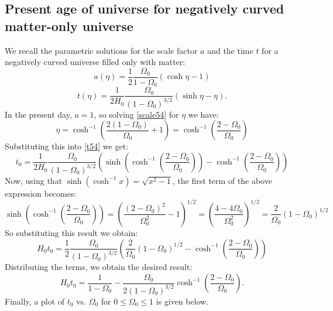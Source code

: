 \subsection{Present age of universe for negatively curved matter-only universe}
We recall the parametric solutions for the scale factor $a$ and the time $t$ for a negatively curved universe filled only with matter:
\begin{equation}\label{scale54}
    a(\eta) = \frac{1}{2}\frac{\Omega_0}{1 - \Omega_0}(\cosh\eta - 1)
\end{equation}
\begin{equation}\label{t54}
    t(\eta) = \frac{1}{2H_0}\frac{\Omega_0}{(1 - \Omega_0)^{3/2}}(\sinh\eta - \eta).
\end{equation}
In the present day, $a = 1$, so solving \eqref{scale54} for $\eta$ we have:
\begin{equation}
    \eta = \cosh^{-1}\left(\frac{2(1 - \Omega_0)}{\Omega_0} + 1\right) = \cosh^{-1}\left(\frac{2 - \Omega_0}{\Omega_0}\right)
\end{equation}
Substituting this into \eqref{t54} we get:
\begin{equation}
    t_0 = \frac{1}{2H_0}\frac{\Omega_0}{(1 - \Omega_0)^{3/2}}(\sinh( \cosh^{-1}\left(\frac{2 - \Omega_0}{\Omega_0}\right)) - \cosh^{-1}\left(\frac{2 - \Omega_0}{\Omega_0}\right))
\end{equation}
Now, using that $\sinh(\cosh^{-1}x) = \sqrt{x^2 - 1}$, the first term of the above expression becomes:
\begin{equation}
    \sinh( \cosh^{-1}\left(\frac{2 - \Omega_0}{\Omega_0}\right)) = \left(\frac{(2 - \Omega_0)^2}{\Omega_0^2} - 1\right)^{1/2} = \left(\frac{4 - 4\Omega_0}{\Omega_0^2}\right)^{1/2} = \frac{2}{\Omega_0}(1 - \Omega_0)^{1/2}
\end{equation}
So substituting this result we obtain:
\begin{equation}
    H_0t_0 = \frac{1}{2}\frac{\Omega_0}{(1 - \Omega_0)^{3/2}}\left(\frac{2}{\Omega_0}(1 - \Omega_0)^{1/2} - \cosh^{-1}\left(\frac{2 - \Omega_0}{\Omega_0}\right)\right)
\end{equation}
Distributing the terms, we obtain the desired result:
\begin{equation}
    \boxed{H_0t_0 = \frac{1}{1 - \Omega_0} - \frac{\Omega_0}{2(1 - \Omega_0)^{3/2}}\cosh^{-1}\left(\frac{2 - \Omega_0}{\Omega_0}\right)}.
\end{equation}
Finally, a plot of $t_0$ vs. $\Omega_0$ for $0 \leq \Omega_0 \leq 1$ is given below.


